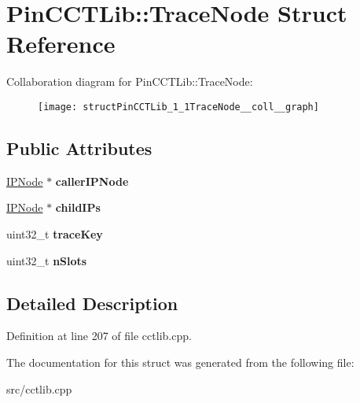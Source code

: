 \hypertarget{structPinCCTLib_1_1TraceNode}{\section{Pin\-C\-C\-T\-Lib\-:\-:Trace\-Node Struct Reference}
\label{structPinCCTLib_1_1TraceNode}
}


Collaboration diagram for Pin\-C\-C\-T\-Lib\-:\-:Trace\-Node\-:
\nopagebreak
\begin{figure}[H]
\begin{center}
\leavevmode
\texttt{[image: structPinCCTLib\_1\_1TraceNode\_\_coll\_\_graph]}
\end{center}
\end{figure}
\subsection*{Public Attributes}
\begin{DoxyCompactItemize}
\item 
\hypertarget{structPinCCTLib_1_1TraceNode_af69afd805789f70828b08e67f64f65a9}{\hyperlink{structPinCCTLib_1_1IPNode}{I\-P\-Node} $\ast$ {\bfseries caller\-I\-P\-Node}}\label{structPinCCTLib_1_1TraceNode_af69afd805789f70828b08e67f64f65a9}

\item 
\hypertarget{structPinCCTLib_1_1TraceNode_a1e3b09c3c476d79ae6f46144158d1d4c}{\hyperlink{structPinCCTLib_1_1IPNode}{I\-P\-Node} $\ast$ {\bfseries child\-I\-Ps}}\label{structPinCCTLib_1_1TraceNode_a1e3b09c3c476d79ae6f46144158d1d4c}

\item 
\hypertarget{structPinCCTLib_1_1TraceNode_ade5ecd423447b39e143a30f49ec92654}{uint32\-\_\-t {\bfseries trace\-Key}}\label{structPinCCTLib_1_1TraceNode_ade5ecd423447b39e143a30f49ec92654}

\item 
\hypertarget{structPinCCTLib_1_1TraceNode_a818592b271ac590c84ed55f5d1418436}{uint32\-\_\-t {\bfseries n\-Slots}}\label{structPinCCTLib_1_1TraceNode_a818592b271ac590c84ed55f5d1418436}

\end{DoxyCompactItemize}


\subsection{Detailed Description}


Definition at line 207 of file cctlib.\-cpp.



The documentation for this struct was generated from the following file\-:\begin{DoxyCompactItemize}
\item 
src/cctlib.\-cpp\end{DoxyCompactItemize}
